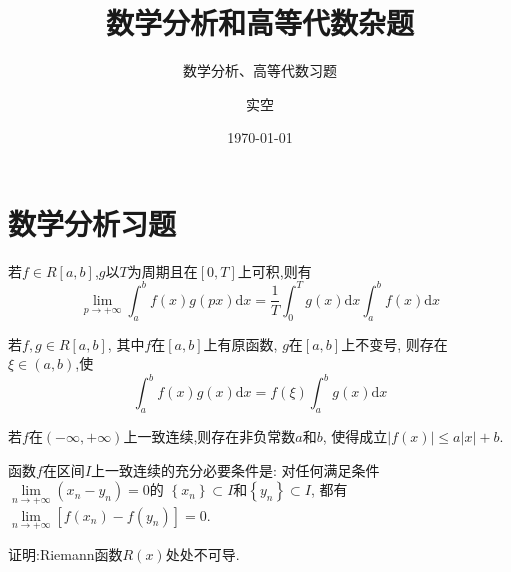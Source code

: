 \documentclass[lang=cn,newtx,10pt,scheme=chinese]{../Template/elegantbook}
\title{数学分析和高等代数杂题}
\subtitle{数学分析、高等代数习题}
\author{实空}
\institute{无}
\date{\today}
\begin{document}
\maketitle
\frontmatter

\tableofcontents

\mainmatter%


\chapter{数学分析习题}

\begin{lemma}[Riemann 引理] \label{thm:Riemann}
若$f\in R\left[ a,b \right] $,$g$以$T$为周期且在$\left[ 0,T \right] $上可积,则有
\begin{equation}
\underset{p\rightarrow +\infty}{\lim}\int_a^b{f\left( x \right) g\left( px \right) \mathrm{d}x=\frac{1}{T}}\int_0^T{g\left( x \right) \mathrm{d}x}\int_a^b{f\left( x \right) \mathrm{d}x}
\end{equation}
\end{lemma}

\begin{theorem}[积分第一中值定理的推广] \label{thm:JFdyZZ}
若$f,g\in R\left[ a,b \right] $,
其中$f$在$\left[ a,b \right] $上有原函数,
$g$在$\left[ a,b \right] $上不变号,
则存在$\xi \in \left( a,b \right) $,使
\begin{equation}
\int_a^b{f\left( x \right) g\left( x \right) \mathrm{d}x}=f\left( \xi \right) \int_a^b{g\left( x \right) \mathrm{d}x}
\end{equation}
\end{theorem}

\begin{proposition} \label{pro:YZLXHS}
若$f$在$\left( -\infty ,+\infty \right) $上一致连续,则存在非负常数$a$和$b$,
使得成立$\left| f\left( x \right) \right|\leqslant a\left| x \right|+b$.
\end{proposition}

\begin{proposition} \label{pro:HSYZLXCYTJ}
函数$f$在区间$I$上一致连续的充分必要条件是:
对任何满足条件$\underset{n\rightarrow +\infty}{\lim}\left( x_n-y_n \right) =0$的
$\left\{ x_n \right\} \subset I$和$\left\{ y_n \right\} \subset I$,
都有$\underset{n\rightarrow +\infty}{\lim}\left[ f\left( x_n \right) -f\left( y_n \right) \right] =0$.
\end{proposition}


\newpage


\begin{example}
证明:Riemann函数$R(x)$处处不可导.
\end{example}
\end{document}
